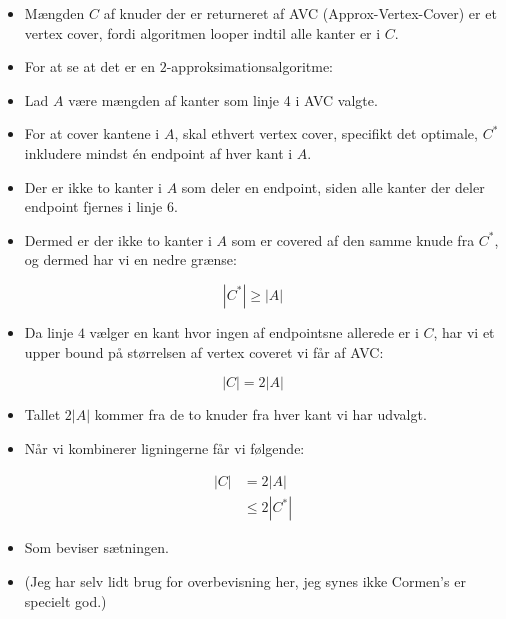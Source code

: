 \begin{frame}[allowframebreaks]
\begin{itemize}
  \item Mængden $C$ af knuder der er returneret af AVC (Approx-Vertex-Cover) er et vertex cover, fordi algoritmen looper indtil alle kanter er i $C$.
  \item For at se at det er en $2$-approksimationsalgoritme:
  \item Lad $A$ være mængden af kanter som linje 4 i AVC valgte.
  \item For at cover kantene i $A$, skal ethvert vertex cover, specifikt det optimale, $C^{*}$ inkludere mindst én endpoint af hver kant i $A$.
  \item Der er ikke to kanter i $A$ som deler en endpoint, siden alle kanter der deler endpoint fjernes i linje 6.
  \item Dermed er der ikke to kanter i $A$ som er covered af den samme knude fra $C^{*}$, og dermed har vi en nedre grænse:
\end{itemize}
\begin{equation}
|C^{*}| \ge |A|
\end{equation}
\begin{itemize}
  \item Da linje $4$ vælger en kant hvor ingen af endpointsne allerede er i $C$, har vi et upper bound på størrelsen af vertex coveret vi får af AVC:
\end{itemize}
\begin{equation}
|C| = 2|A|
\end{equation}
\begin{itemize}
  \item Tallet $2|A|$ kommer fra de to knuder fra hver kant vi har udvalgt.
  \item Når vi kombinerer ligningerne får vi følgende:
\end{itemize}
\begin{align*}
  |C| &= 2|A|\\
  &\le 2|C^{*}|
\end{align*}
\begin{itemize}
  \item Som beviser sætningen.
  \item (Jeg har selv lidt brug for overbevisning her, jeg synes ikke Cormen's er specielt god.)
\end{itemize}
\end{frame}

